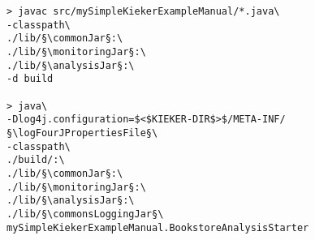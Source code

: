 \begin{lstlisting} 			
> javac src/mySimpleKiekerExampleManual/*.java\
-classpath\ 		
./lib/§\commonJar§:\
./lib/§\monitoringJar§:\
./lib/§\analysisJar§:\
-d build

> java\
-Dlog4j.configuration=$<$KIEKER-DIR$>$/META-INF/§\logFourJPropertiesFile§\
-classpath\ 	
./build/:\
./lib/§\commonJar§:\
./lib/§\monitoringJar§:\
./lib/§\analysisJar§:\
./lib/§\commonsLoggingJar§\
mySimpleKiekerExampleManual.BookstoreAnalysisStarter 
\end{lstlisting}	
